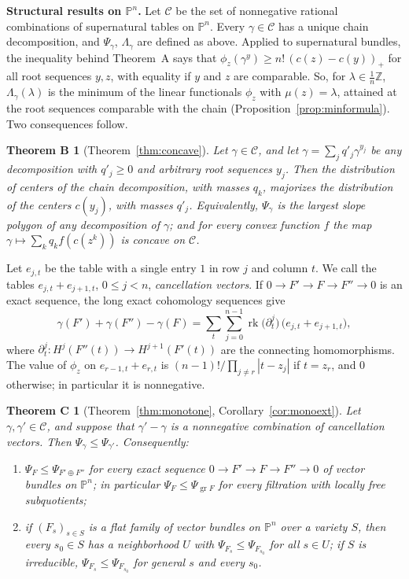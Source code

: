 \documentclass[11pt]{amsart}
\newtheorem*{theoremB}{Theorem B}
\newtheorem*{theoremC}{Theorem C}
\theoremstyle{definition}
\theoremstyle{remark}
\newcommand{\PP}{\mathbb{P}}
\newcommand{\ZZ}{\mathbb{Z}}
\newcommand{\CC}{\mathcal{C}}
\DeclareMathOperator{\rk}{rk}
\DeclareMathOperator{\gr}{gr}
\begin{document}
\medskip\noindent\textbf{Structural results on \texorpdfstring{$\PP^n$}{Pn}.}
Let $\CC$ be the set of nonnegative rational combinations of supernatural tables on $\PP^n$. Every $\gamma\in\CC$ has a unique chain decomposition, and $\Psi_\gamma$, $\Lambda_\gamma$ are defined as above. Applied to supernatural bundles, the inequality behind Theorem~A says that $\phi_z(\gamma^y)\ge n!\,(c(z)-c(y))_+$ for all root sequences $y,z$, with equality if $y$ and $z$ are comparable. So, for $\lambda\in\frac1n\ZZ$, $\Lambda_\gamma(\lambda)$ is the minimum of the linear functionals $\phi_z$ with $\mu(z)=\lambda$, attained at the root sequences comparable with the chain (Proposition~\ref{prop:minformula}). Two consequences follow.

\begin{theoremB}[Theorem~\ref{thm:concave}]
Let $\gamma\in\CC$, and let $\gamma=\sum_jq'_j\gamma^{y_j}$ be any decomposition with $q'_j\ge0$ and arbitrary root sequences $y_j$. Then the distribution of centers of the chain decomposition, with masses $q_k$, majorizes the distribution of the centers $c(y_j)$, with masses $q'_j$. Equivalently, $\Psi_\gamma$ is the largest slope polygon of any decomposition of $\gamma$; and for every convex function $f$ the map $\gamma\mapsto\sum_kq_kf(c(z^k))$ is concave on $\CC$.
\end{theoremB}

Let $e_{j,t}$ be the table with a single entry $1$ in row $j$ and column $t$. We call the tables $e_{j,t}+e_{j+1,t}$, $0\le j<n$, \emph{cancellation vectors}. If $0\to F'\to F\to F''\to0$ is an exact sequence, the long exact cohomology sequences give
\[
\gamma(F')+\gamma(F'')-\gamma(F)=\sum_{t}\sum_{j=0}^{n-1}\rk\big(\partial^j_t\big)\,\big(e_{j,t}+e_{j+1,t}\big),
\]
where $\partial^j_t\colon H^j(F''(t))\to H^{j+1}(F'(t))$ are the connecting homomorphisms. The value of $\phi_z$ on $e_{r-1,t}+e_{r,t}$ is $(n-1)!/\prod_{j\ne r}|t-z_j|$ if $t=z_r$, and $0$ otherwise; in particular it is nonnegative.

\begin{theoremC}[Theorem~\ref{thm:monotone}, Corollary~\ref{cor:monoext}]
Let $\gamma,\gamma'\in\CC$, and suppose that $\gamma'-\gamma$ is a nonnegative combination of cancellation vectors. Then $\Psi_\gamma\le\Psi_{\gamma'}$. Consequently:
\begin{enumerate}[label=\textup{(\roman*)}]
\item $\Psi_F\le\Psi_{F'\oplus F''}$ for every exact sequence $0\to F'\to F\to F''\to0$ of vector bundles on $\PP^n$; in particular $\Psi_F\le\Psi_{\gr F}$ for every filtration with locally free subquotients;
\item if $(F_s)_{s\in S}$ is a flat family of vector bundles on $\PP^n$ over a variety $S$, then every $s_0\in S$ has a neighborhood $U$ with $\Psi_{F_s}\le\Psi_{F_{s_0}}$ for all $s\in U$; if $S$ is irreducible, $\Psi_{F_s}\le\Psi_{F_{s_0}}$ for general $s$ and every $s_0$.
\end{enumerate}
\end{theoremC}
\end{document}
